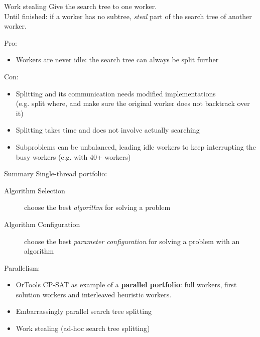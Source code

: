 \documentclass{cons-beamer}
\begin{document}
\begin{frame}{Work stealing}
	Give the search tree to one worker.\\
	Until finished: if a worker has no subtree, \textit{steal} part of the search tree of another worker.
	\vfill
	
	Pro:
	\begin{itemize}
		\item Workers are never idle: the search tree can always be split further
	\end{itemize}
	
	Con:
	\begin{itemize}
		\item Splitting and its communication needs modified implementations \\
		(e.g. split where, and make sure the original worker does not backtrack over it)
		\item Splitting takes time and does not involve actually searching
		\item Subproblems can be unbalanced, leading idle workers to keep interrupting the busy workers (e.g. with 40+ workers)
	\end{itemize}
\end{frame}

\begin{frame}{Summary}
  Single-thread portfolio:
  \begin{description}
    \item[Algorithm Selection] choose the best \emph{algorithm} for solving a problem
    \item[Algorithm Configuration] choose the best \emph{parameter configuration}
      for solving a problem with an algorithm
  \end{description}
  \vfill

  Parallelism:
  \begin{itemize}
  	\item OrTools CP-SAT as example of a \textbf{parallel portfolio}: full workers, first solution workers and interleaved heuristic workers.
  	\item Embarrassingly parallel search tree splitting
  	\item Work stealing (ad-hoc search tree splitting)
  \end{itemize}
\end{frame}
\end{document}

